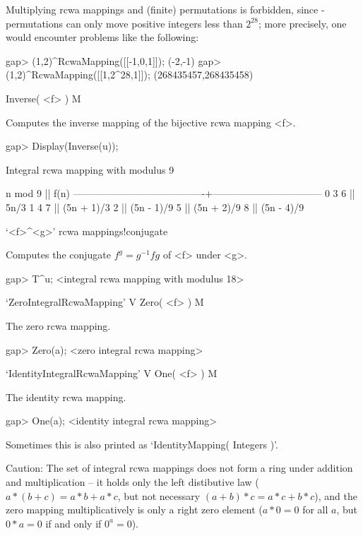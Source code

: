 Multiplying rcwa mappings and (finite) permutations is forbidden, since
{\GAP}-permutations can only move positive integers less than $2^{28}$;
more precisely, one would encounter problems like the following:

\begintt
gap> (1,2)^RcwaMapping([[-1,0,1]]);
(-2,-1)
gap> (1,2)^RcwaMapping([[1,2^28,1]]);
(268435457,268435458)
\endtt

\>Inverse( <f> ) M

Computes the inverse mapping of the bijective rcwa mapping <f>.

\beginexample
gap> Display(Inverse(u));

Integral rcwa mapping with modulus 9

               n mod 9                  ||              f(n)              
----------------------------------------+---------------------------------
  0 3 6                                 || 5n/3
  1 4 7                                 || (5n + 1)/3
  2                                     || (5n - 1)/9
  5                                     || (5n + 2)/9
  8                                     || (5n - 4)/9

\endexample

\>`<f>^<g>' {rcwa mappings!conjugate}

Computes the conjugate $f^g = g^{-1}fg$ of <f> under <g>.

\beginexample
gap> T^u;
<integral rcwa mapping with modulus 18>
\endexample

\>`ZeroIntegralRcwaMapping' V
\>Zero( <f> ) M

The zero rcwa mapping.

\beginexample
gap> Zero(a);
<zero integral rcwa mapping>
\endexample

\>`IdentityIntegralRcwaMapping' V
\>One( <f> ) M

The identity rcwa mapping.

\beginexample
gap> One(a);
<identity integral rcwa mapping>
\endexample

Sometimes this is also printed as `IdentityMapping( Integers )'.

Caution: The set of integral rcwa mappings does not form a ring under
addition and multiplication -- it holds only the left distibutive law
($a*(b+c) = a*b + a*c$, but not necessary $(a+b)*c = a*c + b*c$), and
the zero mapping multiplicatively is only a right zero element 
($a*0 = 0$ for all $a$, but $0*a = 0$ if and only if $0^a = 0$).

